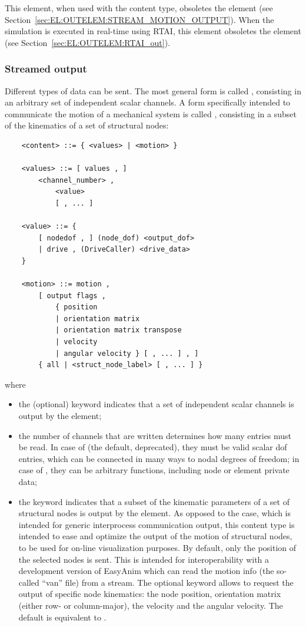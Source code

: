 This element, when used with the  content type,
obsoletes the  element
(see Section~\ref{sec:EL:OUTELEM:STREAM_MOTION_OUTPUT}).
When the simulation is executed in real-time using RTAI,
this element obsoletes the  element
(see Section~\ref{sec:EL:OUTELEM:RTAI_out}).



\subsubsection{Streamed output}
Different types of data can be sent.
The most general form is called , consisting
in an arbitrary set of independent scalar channels.
A form specifically intended to communicate the motion
of a mechanical system is called , consisting
in a subset of the kinematics of a set of structural nodes:
\begin{verbatim}
    <content> ::= { <values> | <motion> }

    <values> ::= [ values , ]
        <channel_number> ,
            <value>
            [ , ... ]

    <value> ::= {
        [ nodedof , ] (node_dof) <output_dof>
        | drive , (DriveCaller) <drive_data>
    }

    <motion> ::= motion ,
        [ output flags ,
            { position
            | orientation matrix
            | orientation matrix transpose
            | velocity
            | angular velocity } [ , ... ] , ]
        { all | <struct_node_label> [ , ... ] }
\end{verbatim}
where
\begin{itemize}
\item the (optional) keyword  indicates that a set
of independent scalar channels is output by the element;

\item the number of channels  that are written
determines how many  entries must be read.
In case of  (the default, deprecated),
they must be valid scalar dof entries, which can be connected
in many ways to nodal degrees of freedom;
in case of , they can be arbitrary functions,
including node or element private data;

\item the keyword  indicates that a subset of the kinematic
parameters of a set of structural nodes is output by the element.
As opposed to the  case, which is intended for generic
interprocess communication output, this content type is intended to ease
and optimize the output of the motion of structural nodes,
to be used for on-line visualization purposes.
By default, only the position of the selected nodes is sent.
This is intended for interoperability with a development version
of EasyAnim which can read the motion info (the so-called ``van'' file)
from a stream.
The optional keyword  allows to request the output
of specific node kinematics: the node position, orientation matrix
(either row- or column-major), the velocity and the angular velocity.
The default is equivalent to .
\end{itemize}
